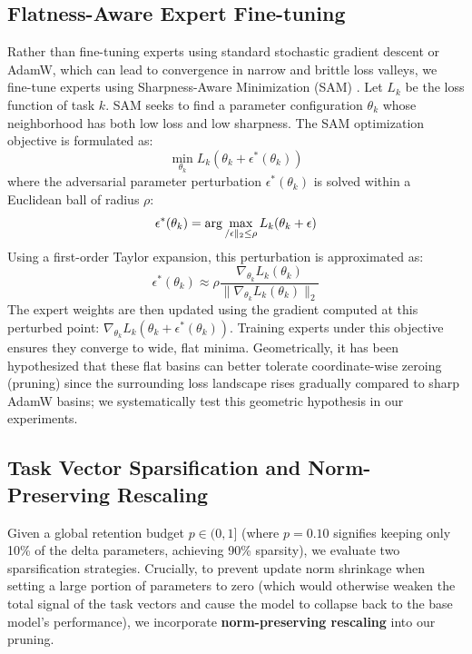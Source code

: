 \subsection{Flatness-Aware Expert Fine-tuning}
Rather than fine-tuning experts using standard stochastic gradient descent or AdamW, which can lead to convergence in narrow and brittle loss valleys, we fine-tune experts using Sharpness-Aware Minimization (SAM) \cite{foret2021sharpness}. Let $L_k$ be the loss function of task $k$. SAM seeks to find a parameter configuration $\theta_k$ whose neighborhood has both low loss and low sharpness. The SAM optimization objective is formulated as:
\begin{equation}
\min_{\theta_k} L_k(\theta_k + \epsilon^*(\theta_k))
\end{equation}
where the adversarial parameter perturbation $\epsilon^*(\theta_k)$ is solved within a Euclidean ball of radius $\rho$:
\begin{equation}
\epsilon^*(\theta_k) = \arg\max_{\//\epsilon\|_2 \le \rho} L_k(\theta_k + \epsilon)
\end{equation}
Using a first-order Taylor expansion, this perturbation is approximated as:
\begin{equation}
\epsilon^*(\theta_k) \approx \rho \frac{\nabla_{\theta_k} L_k(\theta_k)}{\|\nabla_{\theta_k} L_k(\theta_k)\|_2}
\end{equation}
The expert weights are then updated using the gradient computed at this perturbed point: $\nabla_{\theta_k} L_k(\theta_k + \epsilon^*(\theta_k))$. Training experts under this objective ensures they converge to wide, flat minima. Geometrically, it has been hypothesized that these flat basins can better tolerate coordinate-wise zeroing (pruning) since the surrounding loss landscape rises gradually compared to sharp AdamW basins; we systematically test this geometric hypothesis in our experiments.

\subsection{Task Vector Sparsification and Norm-Preserving Rescaling}
Given a global retention budget $p \in (0, 1]$ (where $p=0.10$ signifies keeping only 10\% of the delta parameters, achieving 90\% sparsity), we evaluate two sparsification strategies. Crucially, to prevent update norm shrinkage when setting a large portion of parameters to zero (which would otherwise weaken the total signal of the task vectors and cause the model to collapse back to the base model's performance), we incorporate \textbf{norm-preserving rescaling} into our pruning. 

